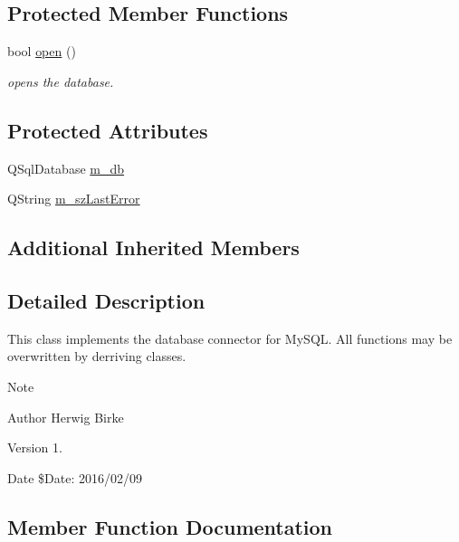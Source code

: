 \subsection*{Protected Member Functions}
\begin{DoxyCompactItemize}
\item 
bool \hyperlink{classc_my_s_q_l_plugin_a574fa4e2d3e7505defaf9550eb9893ec}{open} ()
\begin{DoxyCompactList}\small\item\em opens the database. \end{DoxyCompactList}\end{DoxyCompactItemize}
\subsection*{Protected Attributes}
\begin{DoxyCompactItemize}
\item 
Q\+Sql\+Database \hyperlink{classc_my_s_q_l_plugin_ae8eac3baf1f720e5b36315a611a18d50}{m\+\_\+db}
\item 
Q\+String \hyperlink{classc_my_s_q_l_plugin_aa59160129f7a5c373fef1cfd0d8e281c}{m\+\_\+sz\+Last\+Error}
\end{DoxyCompactItemize}
\subsection*{Additional Inherited Members}


\subsection{Detailed Description}
This class implements the database connector for My\+S\+QL. All functions may be overwritten by derriving classes.

\begin{DoxyNote}{Note}

\end{DoxyNote}
\begin{DoxyAuthor}{Author}
Herwig Birke
\end{DoxyAuthor}
\begin{DoxyVersion}{Version}
1.
\end{DoxyVersion}
\begin{DoxyDate}{Date}
\$\+Date\+: 2016/02/09 
\end{DoxyDate}


\subsection{Member Function Documentation}
